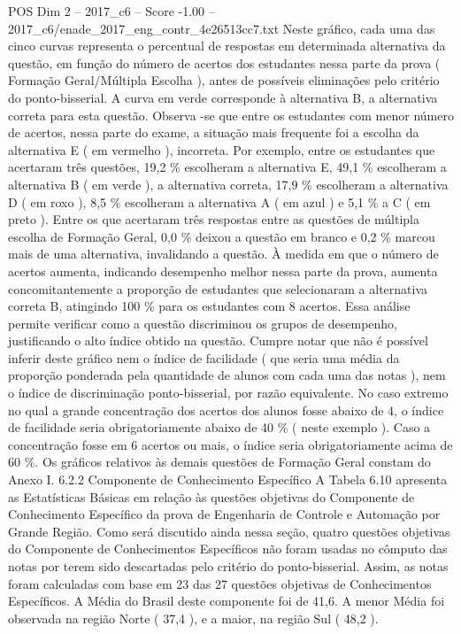 \begin{textsample}{POS Dim 2 – 2017\_c6 – Score -1.00 – 2017\_c6/enade\_2017\_eng\_contr\_4e26513cc7.txt}
Neste gráfico, cada uma das cinco curvas representa o percentual de respostas em determinada alternativa da questão, em função do número de acertos dos estudantes nessa parte da prova ( Formação Geral/Múltipla Escolha ), antes de possíveis eliminações pelo critério do ponto-bisserial.
A curva em verde corresponde à alternativa B, a alternativa correta para esta questão.
Observa -se que entre os estudantes com menor número de acertos, nessa parte do exame, a situação mais frequente foi a escolha da alternativa E ( em vermelho ), incorreta.
Por exemplo, entre os estudantes que acertaram três questões, 19,2 \% escolheram a alternativa E, 49,1 \% escolheram a alternativa B ( em verde ), a alternativa correta, 17,9 \% escolheram a alternativa D ( em roxo ), 8,5 \% escolheram a alternativa A ( em azul ) e 5,1 \% a C ( em preto ).
Entre os que acertaram três respostas entre as questões de múltipla escolha de Formação Geral, 0,0 \% deixou a questão em branco e 0,2 \% marcou mais de uma alternativa, invalidando a questão.
À medida em que o número de acertos aumenta, indicando desempenho melhor nessa parte da prova, aumenta concomitantemente a proporção de estudantes que selecionaram a alternativa correta B, atingindo 100 \% para os estudantes com 8 acertos.
Essa análise permite verificar como a questão discriminou os grupos de desempenho, justificando o alto índice obtido na questão.
Cumpre notar que não é possível inferir deste gráfico nem o índice de facilidade ( que seria uma média da proporção ponderada pela quantidade de alunos com cada uma das notas ), nem o índice de discriminação ponto-bisserial, por razão equivalente.
No caso extremo no qual a grande concentração dos acertos dos alunos fosse abaixo de 4, o índice de facilidade seria obrigatoriamente abaixo de 40 \% ( neste exemplo ).
Caso a concentração fosse em 6 acertos ou mais, o índice seria obrigatoriamente acima de 60 \%.
Os gráficos relativos às demais questões de Formação Geral constam do Anexo I. 6.2.2 Componente de Conhecimento Específico A Tabela 6.10 apresenta as Estatísticas Básicas em relação às questões objetivas do Componente de Conhecimento Específico da prova de Engenharia de Controle e Automação por Grande Região.
Como será discutido ainda nessa seção, quatro questões objetivas do Componente de Conhecimentos Específicos não foram usadas no cômputo das notas por terem sido descartadas pelo critério do ponto-bisserial.
Assim, as notas foram calculadas com base em 23 das 27 questões objetivas de Conhecimentos Específicos.
A Média do Brasil deste componente foi de 41,6.
A menor Média foi observada na região Norte ( 37,4 ), e a maior, na região Sul ( 48,2 ).

\end{textsample}
